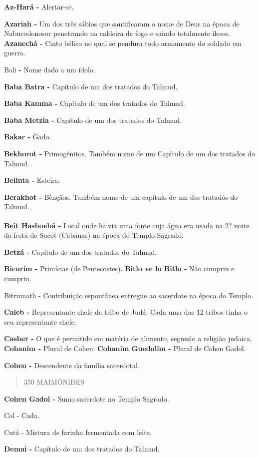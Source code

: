 \textbf{Az-Hará -} Alertar-se.

\textbf{Azariah -} Um dos três sábios que san­tificaram o nome de Deus
na época de Nabucodonosor penetrando na caldei­ra de fogo e saindo
totalmente ilesos. \textbf{Azanechá -} Cinto bélico no qual se pendura
todo armamento do soldado em guerra.

Bali \textbf{-} Nome dado a um ídolo.

\textbf{Baba Batra -} Capítulo de um dos tra­tados do Talmud.

\textbf{Baba Kamma -} Capítulo de um dos tratados do Talmud.

\textbf{Baba Metzia -} Capítulo de um dos tra­tados do Talmud.

\textbf{Bakar -} Gado.

\textbf{Bekhorot -} Primogênitos. Também nome de um Capítulo de um dos
trata­dos do Talmud.

\textbf{Belinta -} Esteira.

\textbf{Berakhot -} Bênçãos. Também nome de um capítulo de um dos
tratadós do Talmud.

\textbf{Beit Hashoebá -} Local onde ha\textsuperscript{:}via uma fonte
cuja água era usada na 2? noite da festa de Sucot (Cabanas) na época do
Templo Sagrado.

\textbf{Betzá -} Capítulo de um dos tratados do Talmud.

\textbf{Bicurim -} Primícias (de Pentecostes). \textbf{Bitlo ve lo Bitlo
-} Não cumpriu e cumpriu.

Bitrumath - Contribuição espontânea entregue ao sacerdote na época do
Templo.

\textbf{Caleb -} Representante chefe da tribo de Judá. Cada uma das 12
tribos tinha o seu representante chefe.

\textbf{Casher -} O que é permitido em matéria de alimento, segundo a
religião judaica. \textbf{Cohanim -} Plural de Cohen. \textbf{Cohanim
Guedolim -} Plural de Co­hen Gadol.

\textbf{Cohen -} Descendente da família sacer­dotal.

\begin{quote}
350 MAIMÔNIDES
\end{quote}

\textbf{Cohen Gadol -} Sumo sacerdote no Templo Sagrado.

Col - Cada.

Cutá - Mistura de farinha fermentada com leite.

\textbf{Demai -} Capítulo de um dos tratados do Talmud.

